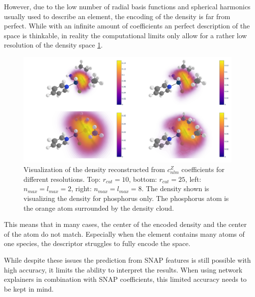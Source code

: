 However, due to the low number of radial basis functions and spherical harmonics usually used to describe an element, 
the encoding of the density is far from perfect.
While with an infinite amount of coefficients an perfect description of the space is thinkable,
in reality the computational limits only allow for a rather low resolution of the density space \ref{fig:snap-density}. 
\begin{figure} [h]
  \centering
  \includegraphics[width=1\textwidth]{figures/snap/density/dense.png} %
  \caption{Visualization of the density reconstructed from $c_{nlm}^Z$ coefficients for different resolutions.
  Top: $r_{cut} = 10$, bottom: $r_{cut} = 25$, left: $n_{max} = l_{max} = 2$, right: $n_{max} = l_{max} = 8$.
  The density shown is visualizing the density for phosphorus only.
  The phosphorus atom is the orange atom surrounded by the density cloud.
  }
  \label{fig:snap-density}
\end{figure}

This means that in many cases, the center of the encoded density and the center of the atom do not match.
Especially when the element contains many atoms of one species, the descriptor struggles to fully encode the space.

While despite these issues the prediction from SNAP features is still possible with high accuracy, it limits the ability to interpret the results.
When using network explainers in combination with SNAP coefficients, this limited accuracy needs to be kept in mind.
